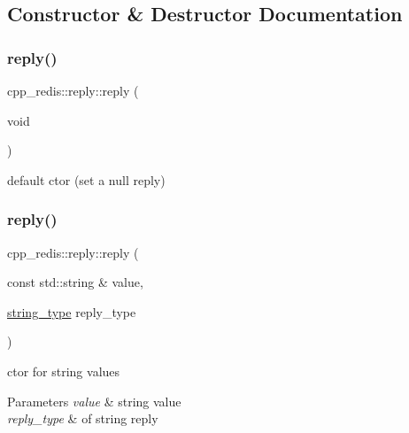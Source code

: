\subsection{Constructor \& Destructor Documentation}
\mbox{\label{classcpp__redis_1_1reply_a8d0b1f8a18b5c7c3ce79784604dba6cc}} 
\subsubsection{\texorpdfstring{reply()}{reply()}\hspace{0.1cm}{\footnotesize\ttfamily [1/5]}}
{\footnotesize\ttfamily cpp\+\_\+redis\+::reply\+::reply (\begin{DoxyParamCaption}\item[{void}]{ }\end{DoxyParamCaption})}

default ctor (set a null reply) \mbox{\label{classcpp__redis_1_1reply_a58fb2a051a001f1c3dcf2cd957441dbc}} 
\subsubsection{\texorpdfstring{reply()}{reply()}\hspace{0.1cm}{\footnotesize\ttfamily [2/5]}}
{\footnotesize\ttfamily cpp\+\_\+redis\+::reply\+::reply (\begin{DoxyParamCaption}\item[{const std\+::string \&}]{value,  }\item[{\hyperlink{classcpp__redis_1_1reply_ac192ba4cb8f2bb6e7cb465edf755328b}{string\+\_\+type}}]{reply\+\_\+type }\end{DoxyParamCaption})}

ctor for string values


\begin{DoxyParams}{Parameters}
{\em value} & string value \\
\hline
{\em reply\+\_\+type} & of string reply \\
\hline
\end{DoxyParams}
\mbox{\label{classcpp__redis_1_1reply_a6200b9fa76196e75fb18aa07e47391f0}} 

